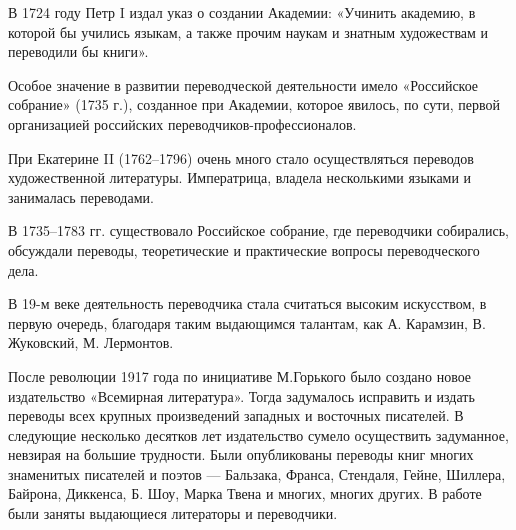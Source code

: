 В 1724 году Петр I издал указ о создании Академии: «Учинить академию, в которой бы учились языкам, а также прочим наукам и знатным художествам и переводили бы книги».

Особое значение в развитии переводческой деятельности имело «Российское собрание» (1735 г.), созданное при Академии, которое явилось, по сути, первой организацией российских переводчиков-профессионалов.

При Екатерине II (1762--1796) очень много стало осуществляться переводов художественной литературы. Императрица, владела несколькими языками и занималась переводами.

В 1735--1783 гг. существовало Российское собрание, где переводчики собирались, обсуждали переводы, теоретические и практические вопросы переводческого дела.

В 19-м веке деятельность переводчика стала считаться высоким искусством, в первую очередь, благодаря таким выдающимся талантам, как А. Карамзин, В. Жуковский, М. Лермонтов.

После революции 1917 года по инициативе М.Горького было создано новое издательство «Всемирная литература». Тогда задумалось исправить и издать переводы всех крупных произведений западных и восточных писателей. В следующие несколько десятков лет издательство сумело осуществить задуманное, невзирая на большие трудности. Были опубликованы переводы книг многих знаменитых писателей и поэтов --- Бальзака, Франса, Стендаля, Гейне, Шиллера, Байрона, Диккенса, Б. Шоу, Марка Твена и многих, многих других. В работе были заняты выдающиеся литераторы и переводчики.








